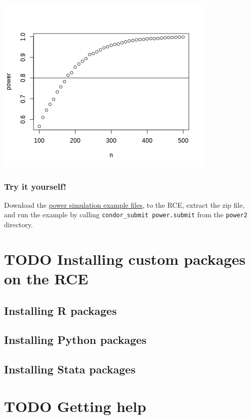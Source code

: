 \documentclass[11pt]{article}
\begin{document}
\includegraphics[width=.9\linewidth]{images/powerDist.png}

\subsubsection{Try it yourself!}
\label{sec-7-4-4}
Download the \href{examples/power2.zip}{power simulation example files}, to the RCE, extract the zip file, and run the example by calling \texttt{condor\_submit power.submit} from the \texttt{power2} directory.

\section{{\bfseries\sffamily TODO} Installing custom packages on the RCE}
\label{sec-8}


\subsection{Installing R packages}
\label{sec-8-1}

\subsection{Installing Python packages}
\label{sec-8-2}

\subsection{Installing Stata packages}
\label{sec-8-3}

\section{{\bfseries\sffamily TODO} Getting help}
\label{sec-9}
\end{document}
